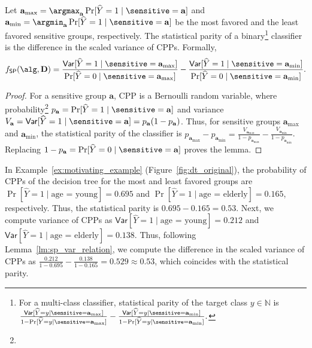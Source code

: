 \begin{lemma}
	\label{lm:sp_var_relation}
	Let $ \mathbf{a}_{\max} = \argmax_{\mathbf{a}} \Pr[\widehat{Y} = 1 \mid  \sensitive = \mathbf{a}] $ and $ \mathbf{a}_{\min} = \argmin_{\mathbf{a}} \Pr[\widehat{Y} = 1 \mid \sensitive = \mathbf{a}] $ be the most favored and the least favored sensitive groups, respectively. The statistical parity of a binary\footnote{For a multi-class classifier, statistical parity of the target class $ y \in \mathbb{N} $ is $ \frac{\mathsf{Var}[\widehat{Y} = y \mid \sensitive = \mathbf{a}_{\max}]}{1 - \Pr[\widehat{Y} = y \mid  \sensitive = \mathbf{a}_{\max}]} - \frac{\mathsf{Var}[\widehat{Y} = y \mid \sensitive = \mathbf{a}_{\min}] }{1 - \Pr[\widehat{Y} = y \mid  \sensitive = \mathbf{a}_{\min}]}. $} classifier is the difference in the scaled variance of CPPs. Formally, 
	\[
	 f_{\mathsf{SP}}(\alg, \mathbf{D}) = \frac{\mathsf{Var}[\widehat{Y} = 1\mid\sensitive = \mathbf{a}_{\max}]}{\Pr[\widehat{Y} = 0 \mid  \sensitive = \mathbf{a}_{\max}]} - \frac{\mathsf{Var}[\widehat{Y} = 1\mid\sensitive = \mathbf{a}_{\min}] }{\Pr[\widehat{Y} = 0 \mid  \sensitive = \mathbf{a}_{\min}]}.
	\]
\end{lemma}
\begin{proof}
	For a sensitive group $ \mathbf{a} $, CPP  is a Bernoulli random variable, where probability\footnote{} $ p_{\mathbf{a}}  = \Pr[\widehat{Y} = 1 \mid \sensitive = \mathbf{a}] $ and variance $ V_{\mathbf{a}} = \mathsf{Var}[\widehat{Y} = 1 \mid \sensitive = \mathbf{a}] = p_{\mathbf{a}} (1 - p_{\mathbf{a}}) $. Thus, for sensitive groups $ \mathbf{a}_{\max} $ and $ \mathbf{a}_{\min} $, the statistical parity of the classifier is $ p_{\mathbf{a}_{\max}}  - p_{\mathbf{a}_{\min}} =  \frac{V_{\mathbf{a}_{\max}}}{1 - p_{\mathbf{a}_{\max}}}  - \frac{V_{\mathbf{a}_{\min}}}{1 - p_{\mathbf{a}_{\min}}} $. Replacing $ 1 - p_\mathbf{a} = \Pr[\widehat{Y} = 0 \mid \sensitive = \mathbf{a}] $  proves the lemma.
\end{proof}


\begin{example}
	In Example~\ref{ex:motivating_example} (Figure~\ref{fig:dt_original}), the probability of CPPs of the decision tree for the most and least favored groups are $  \Pr[\widehat{Y} = 1 \mid \text{age = young}] = 0.695 $ and $ \Pr[\widehat{Y} = 1 \mid \text{age = elderly}] = 0.165 $, respectively. Thus, the statistical parity is $ 0.695 - 0.165 =  0.53 $. Next, we compute variance of CPPs as $  \mathsf{Var}[\widehat{Y} = 1\mid \text{age = young}] = 0.212 $ and $  \mathsf{Var}[\widehat{Y} = 1\mid \text{age = elderly}] = 0.138 $. Thus, following Lemma~\ref{lm:sp_var_relation}, we compute the difference in the scaled  variance of CPPs as $ \frac{0.212}{1 - 0.695} - \frac{0.138}{1 - 0.165} =  0.529 \approx 0.53 $, which coincides with the statistical parity.
\end{example}




